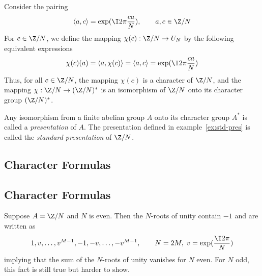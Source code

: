 \begin{example}\label{ex:std-pres}
Consider the pairing
\[ 
\langle a, c \rangle = \exp(\I 2\pi \frac{ca}{N}), \qquad a,c \in \Z /N
\]
For $c\in \Z /N$, we define the mapping $\chi(c): \Z /N \to U_N$
by the following equivalent expressions
\begin{equation}\label{eq:2}
\chi(c)(a) = \langle a, \chi(c)\rangle = \langle a, c \rangle 
= \exp(\I 2\pi \frac{ca}{N})
\end{equation}
Thus, for all $c\in \Z/N$, the mapping $\chi(c)$ is a character of $\Z /N$,
and the mapping $\chi: \Z /N \to (\Z /N )^*$ is an isomorphism
of $\Z /N$ onto its character group $(\Z /N )^*$.
\end{example}

Any isomorphism from a finite abelian group $A$ onto its character group $A^*$
is called a \emph{presentation} of $A$.  The presentation defined in
example~\ref{ex:std-pres} is called the \emph{standard presentation} of
$\Z/N$. 

{\subsection{Character Formulas}}
{\subsection{Character Formulas\protect\footnotemark}
}
\label{sec:char-form}
\begin{example}
Suppose $A = \Z/N$ and $N$ is even.  Then the $N$-roots of unity contain $-1$
and are written as
\[
1, v, \ldots, v^{M-1}, -1, -v,\ldots, -v^{M-1}, \qquad N=2M, \; v=\exp(\frac{\I 2\pi}{N})
\]
implying that the sum of the $N$-roots of unity vanishes for $N$ even.  For
$N$ odd, this fact is still true but harder to show.
\end{example}

